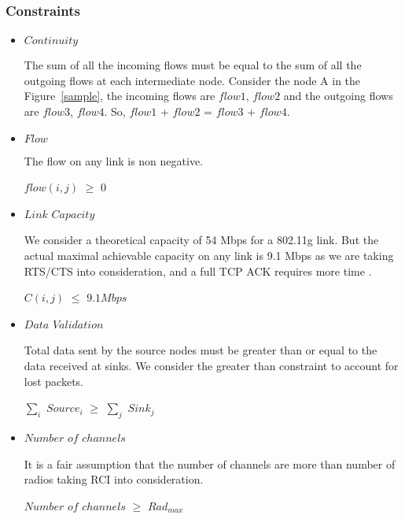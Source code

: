 \documentclass[conference]{IEEEtran}
\begin{document}
\subsubsection{Constraints}
\begin{itemize}
 \item $Continuity$
 
The sum of all the incoming flows must be equal to the sum of all the outgoing flows at each intermediate node.
Consider the node A in the Figure~\ref{sample}, the incoming flows are $flow1$, $flow2$ and the outgoing flows are $flow3$, $flow4$.
So,  $flow1$ + $flow2$ = $flow3$ + $flow4$.

\item $Flow$

The flow on any link is non negative.
\begin{center}
$flow(i,j)$ $\geq$ $0$ 
 
\end{center}

\item $Link$ $Capacity$ 

We consider a theoretical capacity of 54 Mbps for a 802.11g link. But the actual maximal achievable capacity on any link is 9.1 Mbps \cite{throughputmax} 
as we are taking RTS/CTS into consideration, and a full TCP ACK requires more time . 
\begin{center}
 $C(i,j)$  $\leq$ $9.1 Mbps$ 
\end{center}


\item $Data$ $Validation$

Total data sent by the source nodes must be greater than or equal to the data received at sinks. We consider the greater than constraint to account for lost packets.
\begin{center}

$\sum_{i}$ $Source_i$ $\geq$ $\sum_{j}$ $Sink_j$
 
\end{center}
\item $Number$ $of$ $channels$

It is a fair assumption that the number of channels are more than number of radios taking RCI into consideration.
\begin{center}
 $Number$ $of$ $channels$ $\geq$ $Rad_{max}$
\end{center}

\end{itemize}
\end{document}
